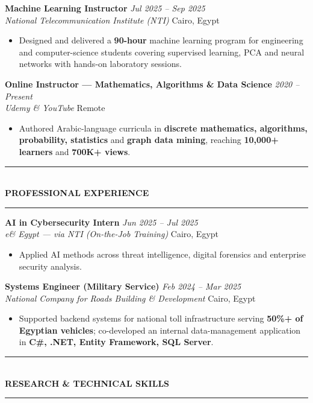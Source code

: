 \documentclass[10pt, a4paper]{article}
\newcommand{\cvsection}[1]{%
  \vspace{3pt}%
  {\color{navy}\rule{\linewidth}{1.1pt}}\\[0.5pt]%
  {\color{navy}\bfseries\fontsize{9.5}{11}\selectfont\uppercase{#1}}\\[-4pt]%
  {\color{teal}\rule{\linewidth}{0.6pt}}%
  \vspace{2pt}%
}
\newcommand{\cventry}[4]{%
  \vspace{2.5pt}%
  \textbf{\color{darkgray}#1} \hfill {\color{midgray}\textit{#3}}\\[-1.5pt]%
  {\color{teal}\textit{#2}} \hfill {\color{midgray}#4}%
}
\newenvironment{cvitems}{%
  \begin{itemize}[leftmargin=11pt, itemsep=0.5pt, parsep=0pt, topsep=1pt,
                  label={\textcolor{teal}{$\bullet$}}]
}{%
  \end{itemize}%
}
\begin{document}
\cventry{Machine Learning Instructor}{National Telecommunication Institute (NTI)}
        {Jul 2025 -- Sep 2025}{Cairo, Egypt}
\begin{cvitems}
  \item Designed and delivered a \textbf{90-hour} machine learning program for engineering and computer-science students covering supervised learning, PCA and neural networks with hands-on laboratory sessions.
\end{cvitems}

\cventry{Online Instructor --- Mathematics, Algorithms \& Data Science}{Udemy \& YouTube}
        {2020 -- Present}{Remote}
\begin{cvitems}
  \item Authored Arabic-language curricula in \textbf{discrete mathematics, algorithms, probability, statistics} and \textbf{graph data mining}, reaching \textbf{10,000+ learners} and \textbf{700K+ views}.
\end{cvitems}

\cvsection{Professional Experience}

\cventry{AI in Cybersecurity Intern}{e\& Egypt --- via NTI (On-the-Job Training)}
        {Jun 2025 -- Jul 2025}{Cairo, Egypt}
\begin{cvitems}
  \item Applied AI methods across threat intelligence, digital forensics and enterprise security analysis.
\end{cvitems}

\cventry{Systems Engineer (Military Service)}{National Company for Roads Building \& Development}
        {Feb 2024 -- Mar 2025}{Cairo, Egypt}
\begin{cvitems}
  \item Supported backend systems for national toll infrastructure serving \textbf{50\%+ of Egyptian vehicles}; co-developed an internal data-management application in \textbf{C\#, .NET, Entity Framework, SQL Server}.
\end{cvitems}

\cvsection{Research \& Technical Skills}
\end{document}
